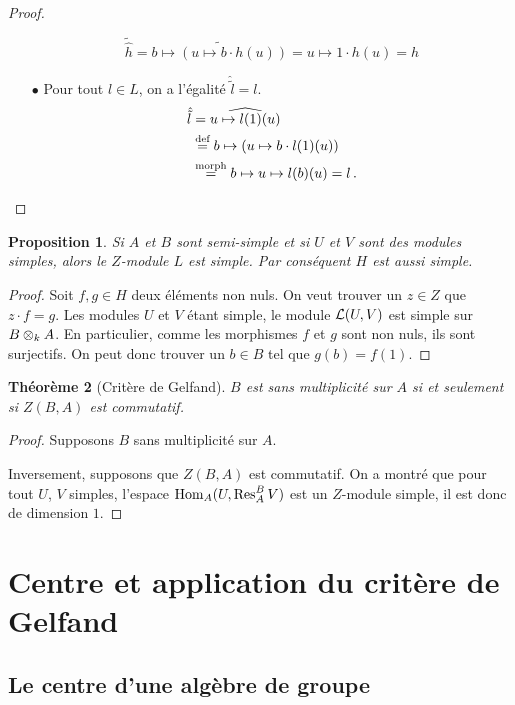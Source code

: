 \documentclass[francais,a4paper,11pt,reqno]{amsart}
\theoremstyle{plain}
\newtheorem{THEO}{\bf Théorème}[section]
\newtheorem{PROP}[THEO]{\bf Proposition}
\theoremstyle{definition}
\theoremstyle{remark}
\newcommand{\act}{\cdot}
\newcommand\eqcom[1]{\mathrel{\overset{\text{#1}}{=}}}
\begin{document}
\begin{proof}
\begin{itemize}
    \begin{equation}
      \tilde{\hat{h}} = \widetilde{b \mapsto (u \mapsto b\act h(u))}
      = u \mapsto 1\act h(u) = h
    \end{equation}
  \item[$\bullet$] Pour tout $l\in L$, on a l'égalité $\hat{\tilde{l}} = l$.
    \begin{align}
      \hat{\tilde{l}} &= \widehat{u \mapsto l(1)(u)}\\
      &\eqcom{def}b \mapsto (u \mapsto b\act l(1)(u)) \\
      &\eqcom{morph}b \mapsto u \mapsto l(b)(u) = l\,.\qedhere
    \end{align}
  \end{itemize}
\end{proof}

\begin{PROP}
  Si $A$ et $B$ sont semi-simple et si $U$ et $V$ sont des modules simples,
  alors le $Z$-module $L$ est simple. Par conséquent $H$ est aussi simple.
\end{PROP}
\begin{proof}
  Soit $f,g\in H$ deux éléments non nuls. On veut trouver un $z\in Z$ que
  $z\act f = g$. Les modules $U$ et $V$ étant simple, le module $\operatorname{\mathcal L}(U,V)$
  est simple sur $B\otimes_k A$. En particulier, comme les morphismes $f$ et
  $g$ sont non nuls, ils sont surjectifs. On peut donc trouver un $b\in B$ tel
  que $g(b) = f(1)$. 
\end{proof}
\begin{THEO}[Critère de Gelfand]
  $B$ est sans multiplicité sur $A$ si et seulement si $Z(B, A)$ est
  commutatif.
\end{THEO}
\begin{proof}
  Supposons $B$ sans multiplicité sur $A$. \TODO{}
  
  Inversement, supposons que $Z(B, A)$ est commutatif. On a montré que pour
  tout $U$, $V$ simples, l'espace $\operatorname{Hom}_A(U, \operatorname{Res}^B_A V)$ est un $Z$-module
  simple, il est donc de dimension $1$.
\end{proof}


\section{Centre et application du critère de Gelfand}

\subsection{Le centre d'une algèbre de groupe}
\end{document}

